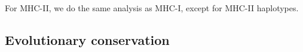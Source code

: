 \documentclass{article}
\newcommand{\frans}[1]{\textcolor{blue}{\textbf{[FB: #1]}}}
\newcommand{\richel}[1]{\textcolor{orange}{\textbf{[RB: #1]}}}
\begin{document}
For MHC-II, we do the same analysis as MHC-I, except for
MHC-II haplotypes.






\subsection{Evolutionary conservation}
\end{document}
